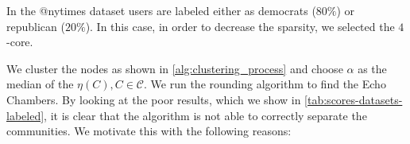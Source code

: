 In the @nytimes dataset users are labeled either as democrats ($80\%$) or republican
($20\%$). In this case, in order to decrease the sparsity, we selected the
$4$-core.


We cluster the nodes as shown in \autoref{alg:clustering_process}
and choose $\alpha $ as the median of the $\eta(C), C \in \mathcal{C} $. We run
the rounding algorithm to find the Echo Chambers. By
looking at the poor results, which we show in
\autoref{tab:scores-datasets-labeled}, it is clear that the algorithm is not
able to correctly separate the communities. We motivate this with the following
reasons:
